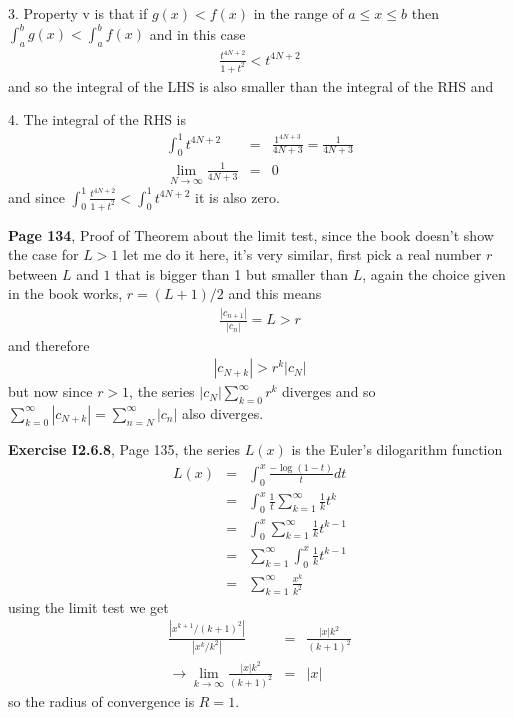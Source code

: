 \documentclass[aps,preprint,preprintnumbers,nofootinbib,showpacs,prd]{revtex4-1}
\newcommand{\nbea}{\begin{eqnarray*}}
\newcommand{\neea}{\end{eqnarray*}}
\begin{document}
3. Property v is that if $g(x) < f(x)$ in the range of $a \le x \le b$ then $\int_a^b g(x) < \int_a^b f(x)$ and in this case
%
\nbea
\frac{t^{4N+2}}{1+t^2} < t^{4N+2}
\neea
%
and so the integral of the LHS is also smaller than the integral of the RHS and

4. The integral of the RHS is
%
\nbea
\int_0^1 t^{4N+2} & = & \frac{1^{4N+3}}{4N+3} = \frac{1}{4N+3} \\
\lim_{N\to\infty} \frac{1}{4N+3} & = & 0
\neea
%
and since $\int_0^1\frac{t^{4N+2}}{1+t^2} < \int_0^1 t^{4N+2}$ it is also zero.

{\bf Page 134}, Proof of Theorem about the limit test, since the book doesn't show the case for $L>1$ let me do it here, it's very similar, first pick a real number $r$ between $L$ and $1$ that is bigger than 1 but smaller than $L$, again the choice given in the book works, $r = (L+1)/2$ and this means
%
\nbea
\frac{|c_{n+1}|}{|c_n|} = L > r
\neea
%
and therefore
%
\nbea
|c_{N+k}| > r^k|c_N|
\neea
%
but now since $r > 1$, the series $|c_N|\sum_{k=0}^\infty r^k$ diverges and so $\sum_{k=0}^\infty |c_{N+k}|=\sum_{n=N}^\infty|c_n|$ also diverges.

{\bf Exercise I2.6.8}, Page 135, the series $L(x)$ is the Euler's dilogarithm function
%
\nbea
L(x) & = & \int_0^x \frac{-\log(1-t)}{t} dt \\
& = & \int_0^x \frac{1}{t}\sum_{k=1}^\infty \frac{1}{k} t^k \\
& = & \int_0^x \sum_{k=1}^\infty \frac{1}{k} t^{k-1} \\
& = & \sum_{k=1}^\infty \int_0^x \frac{1}{k} t^{k-1} \\
& = & \sum_{k=1}^\infty\frac{x^k}{k^2}
\neea
%
using the limit test we get
%
\nbea
\frac{|x^{k+1}/(k+1)^2|}{|x^k/k^2|} & = & \frac{|x|k^2}{(k+1)^2} \\
\to \lim_{k\to\infty} \frac{|x|k^2}{(k+1)^2} & = & |x|
\neea
%
so the radius of convergence is $R=1$.
\end{document}
